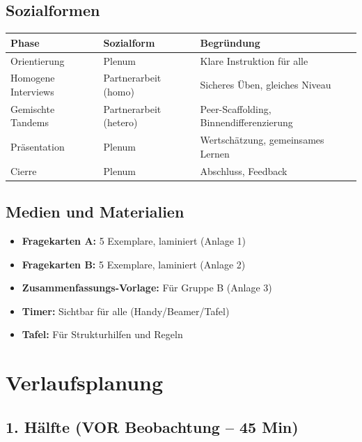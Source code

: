 \documentclass[11pt, a4paper]{article}
\begin{document}
\subsection{Sozialformen}

\begin{center}
\begin{tabular}{|l|l|l|}
    \hline
    \textbf{Phase} & \textbf{Sozialform} & \textbf{Begründung} \\
    \hline
    Orientierung & Plenum & Klare Instruktion für alle \\
    \hline
    Homogene Interviews & Partnerarbeit (homo) & Sicheres Üben, gleiches Niveau \\
    \hline
    Gemischte Tandems & Partnerarbeit (hetero) & Peer-Scaffolding, Binnendifferenzierung \\
    \hline
    Präsentation & Plenum & Wertschätzung, gemeinsames Lernen \\
    \hline
    Cierre & Plenum & Abschluss, Feedback \\
    \hline
\end{tabular}
\end{center}

\subsection{Medien und Materialien}

\begin{itemize}[leftmargin=2em]
    \item \textbf{Fragekarten A:} 5 Exemplare, laminiert (Anlage 1)
    \item \textbf{Fragekarten B:} 5 Exemplare, laminiert (Anlage 2)
    \item \textbf{Zusammenfassungs-Vorlage:} Für Gruppe B (Anlage 3)
    \item \textbf{Timer:} Sichtbar für alle (Handy/Beamer/Tafel)
    \item \textbf{Tafel:} Für Strukturhilfen und Regeln
\end{itemize}


\section{Verlaufsplanung}

\subsection{1. Hälfte (VOR Beobachtung -- 45 Min)}
\end{document}
